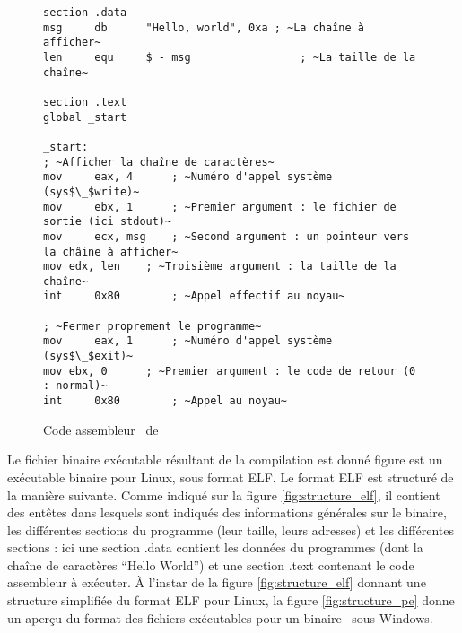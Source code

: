 \begin{figure}
\begin{lstlisting}[language={[x86masm]Assembler}, escapechar=~]
section .data
msg     db      "Hello, world", 0xa	; ~La chaîne à afficher~
len     equ     $ - msg                 ; ~La taille de la chaîne~

section .text
global _start

_start:
; ~Afficher la chaîne de caractères~
mov     eax, 4      ; ~Numéro d'appel système (sys$\_$write)~
mov     ebx, 1      ; ~Premier argument : le fichier de sortie (ici stdout)~
mov     ecx, msg    ; ~Second argument : un pointeur vers la châine à afficher~
mov	edx, len    ; ~Troisième argument : la taille de la chaîne~
int     0x80        ; ~Appel effectif au noyau~

; ~Fermer proprement le programme~
mov     eax, 1      ; ~Numéro d'appel système (sys$\_$exit)~
mov	ebx, 0	    ; ~Premier argument : le code de retour (0 : normal)~
int     0x80	    ; ~Appel au noyau~
\end{lstlisting}
\caption{Code assembleur \xq\ de \helloworld}
\label{fig:helloword_asm}
\end{figure}

Le fichier binaire exécutable résultant de la compilation est donné figure est un exécutable binaire pour Linux, sous format ELF. Le format ELF est structuré de la manière suivante. 
Comme indiqué sur la figure \ref{fig:structure_elf}, il contient des entêtes dans lesquels sont indiqués des informations générales sur le binaire, les différentes sections du programme (leur taille, leurs adresses) et les différentes sections : ici une section .data contient les données du programmes (dont la chaîne de caractères ``Hello World'') et une section .text contenant le code assembleur à exécuter.
À l'instar de la figure \ref{fig:structure_elf} donnant une structure simplifiée du format ELF pour Linux, la figure \ref{fig:structure_pe} donne un aperçu du format des fichiers exécutables pour un binaire \xq\ sous Windows.


